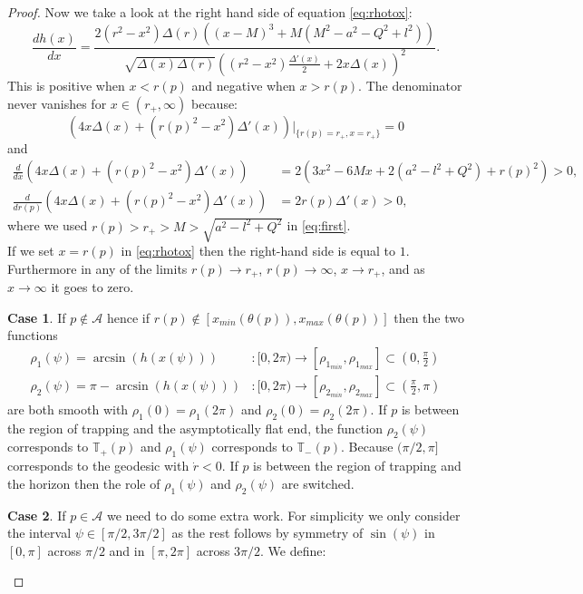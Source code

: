 \documentclass[reqno]{amsart}
\numberwithin{equation}{section}
\theoremstyle{plain}
\theoremstyle{definition}
\newtheorem{case}{Case}
\begin{document}
\begin{proof}
Now we take a look at the right hand side of equation \eqref{eq:rhotox}:
\begin{equation}
\label{eq:hxder}
\frac{d h(x)}{d x}= \frac{2(r^2-x^2)\Delta(r)((x-M)^3+ M(M^2-a^2-Q^2 +l^2))}{\sqrt{\Delta(x)\Delta(r)}((r^2-x^2)\frac{\Delta'(x)}{2}+2x\Delta(x))^2} .
\end{equation} 
This is positive when $x<r(p)$ and negative when $x>r(p)$. The denominator never vanishes for $x\in(r_+,\infty)$ because:
\begin{equation}
(4x\Delta(x)+ (r(p)^2-x^2)\Delta'(x))|_{\{r(p)=r_+, x=r_+\}}=0
\end{equation}
and 
\begin{align}
\frac{d}{dx}(4x\Delta(x)+ (r(p)^2-x^2)\Delta'(x))&=2(3x^2-6Mx+2(a^2-l^2+Q^2)+r(p)^2)>0, \label{eq:first}\\
\frac{d}{dr(p)}(4x\Delta(x)+ (r(p)^2-x^2)\Delta'(x))&=2r(p)\Delta'(x)>0,
\end{align}
where we used $r(p)>r_+>M>\sqrt{a^2-l^2+Q^2}$ in \eqref{eq:first}. \\
If we set $x=r(p)$ in \eqref{eq:rhotox} then the right-hand side is equal to $1$. Furthermore in any of the limits $r(p)\rightarrow r_+$, $r(p)\rightarrow \infty$, $x\rightarrow r_+$, and as $x\rightarrow\infty$ it goes to zero. 
\begin{case}If $p\notin \mathcal{A}$ hence if $r(p)\notin[x_{min}(\theta(p)),x_{max}(\theta(p))]$ then the two functions
\begin{align}
\rho_1(\psi)=\arcsin(h(x(\psi)))&: [0,2\pi)\rightarrow [\rho_{1_{min}},\rho_{1_{max}}]\subset \left(0,\frac{\pi}{2}\right)\\
\rho_2(\psi)=\pi-\arcsin(h(x(\psi)))&: [0,2\pi)\rightarrow[\rho_{2_{min}},\rho_{2_{max}}]\subset\left(\frac{\pi}{2},\pi\right)
\end{align}
are both smooth with $\rho_1(0)=\rho_1(2\pi)$ and $\rho_2(0)=\rho_2(2\pi)$. 
If $p$ is between the region of trapping and the asymptotically flat end, the function $\rho_2(\psi)$ corresponds to $\mathbb{T}_+(p)$ and $\rho_1(\psi)$ corresponds to $\mathbb{T}_-(p)$. Because $(\pi/2,\pi]$ corresponds to the geodesic with $\dot r< 0$. If $p$ is between the region of trapping and the horizon then the role of $\rho_1(\psi)$ and $\rho_2(\psi)$ are switched.
\end{case}
\begin{case}If $p\in \mathcal{A}$ we need to do some extra work. For simplicity we only consider the interval $\psi\in[\pi/2,3\pi/2]$ as the rest follows by symmetry of $\sin(\psi)$ in $[0,\pi]$ across $\pi/2$ and in $[\pi,2\pi]$ across $3\pi/2$. We define:

\end{case}
\end{proof}
\end{document}
